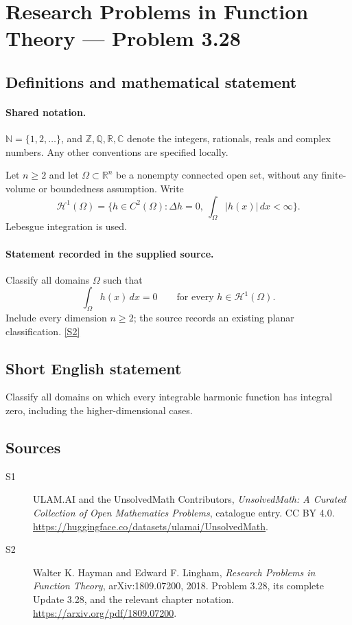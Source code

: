 \documentclass[11pt]{book}
\newcommand{\sref}[2]{\hyperlink{source:#1:#2}{[S#2]}}
\begin{document}
\section{Research Problems in Function Theory — Problem 3.28}\label{statement}

\subsection{Definitions and mathematical statement}

\paragraph{Shared notation.}$\mathbb N=\{1,2,\ldots\}$, and $\mathbb Z,\mathbb Q,\mathbb R,\mathbb C$ denote the integers, rationals, reals and complex numbers. Any other conventions are specified locally.


Let $n\ge2$ and let $\Omega\subset\mathbb R^n$ be a nonempty connected open set, without any finite-volume or boundedness assumption. Write
\[\mathcal H^1(\Omega)=\{h\in C^2(\Omega):\Delta h=0,\ \int_\Omega|h(x)|\,dx<\infty\}.
\]
Lebesgue integration is used.
\paragraph{Statement recorded in the supplied source.}
Classify all domains $\Omega$ such that
\[\int_\Omega h(x)\,dx=0\qquad\text{for every }h\in\mathcal H^1(\Omega).
\]
Include every dimension $n\ge2$; the source records an existing planar classification. \sref{statement}{2}
\subsection{Short English statement}
Classify all domains on which every integrable harmonic function has integral zero, including the higher-dimensional cases.
\subsection{Sources}
\begin{description}
\item[\hypertarget{source:statement:1}{S1}] ULAM.AI and the UnsolvedMath Contributors, \emph{UnsolvedMath: A Curated Collection of Open Mathematics Problems}, catalogue entry. CC BY 4.0. \url{https://huggingface.co/datasets/ulamai/UnsolvedMath}.
\item[\hypertarget{source:statement:2}{S2}] Walter K. Hayman and Edward F. Lingham, \emph{Research Problems in Function Theory}, arXiv:1809.07200, 2018. Problem 3.28, its complete Update 3.28, and the relevant chapter notation. \url{https://arxiv.org/pdf/1809.07200}.
\end{description}
\label{end:statement}
\end{document}
